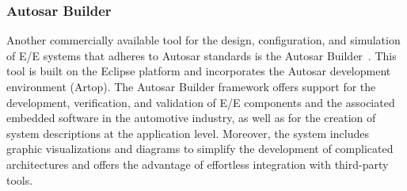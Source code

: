 \subsubsection{Autosar Builder}  %
Another commercially available tool for the design, configuration, and simulation of E/E systems that adheres to Autosar standards is the Autosar Builder~\cite{autosarbuilder1, autosarbuilder}. This tool is built on the Eclipse platform and incorporates the Autosar development environment (Artop). The Autosar Builder framework offers support for the development, verification, and validation of E/E components and the associated embedded software in the automotive industry, as well as for the creation of system descriptions at the application level.
Moreover, the system includes graphic visualizations and diagrams to simplify the development of complicated architectures and offers the advantage of effortless integration with third-party tools.




